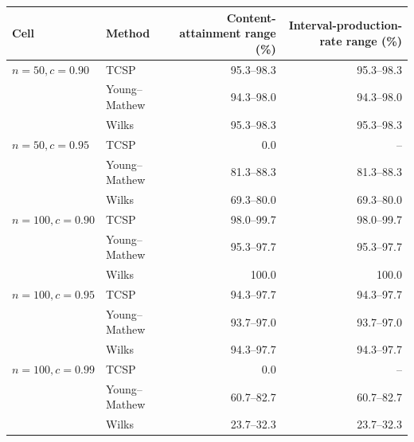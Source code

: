 \begin{tabularx}{\textwidth}{@{}l>{\raggedright\arraybackslash}Xrr@{}}
\toprule
Cell & Method & Content-attainment range (\%) & Interval-production-rate range (\%)\\
\midrule
\(n=50,c=0.90\) & TCSP & 95.3--98.3 & 95.3--98.3 \\
 & Young--Mathew & 94.3--98.0 & 94.3--98.0 \\
 & Wilks & 95.3--98.3 & 95.3--98.3 \\
\addlinespace[0.25em]
\(n=50,c=0.95\) & TCSP & 0.0 & -- \\
 & Young--Mathew & 81.3--88.3 & 81.3--88.3 \\
 & Wilks & 69.3--80.0 & 69.3--80.0 \\
\addlinespace[0.25em]
\(n=100,c=0.90\) & TCSP & 98.0--99.7 & 98.0--99.7 \\
 & Young--Mathew & 95.3--97.7 & 95.3--97.7 \\
 & Wilks & 100.0 & 100.0 \\
\addlinespace[0.25em]
\(n=100,c=0.95\) & TCSP & 94.3--97.7 & 94.3--97.7 \\
 & Young--Mathew & 93.7--97.0 & 93.7--97.0 \\
 & Wilks & 94.3--97.7 & 94.3--97.7 \\
\addlinespace[0.25em]
\(n=100,c=0.99\) & TCSP & 0.0 & -- \\
 & Young--Mathew & 60.7--82.7 & 60.7--82.7 \\
 & Wilks & 23.7--32.3 & 23.7--32.3 \\
\bottomrule
\end{tabularx}
